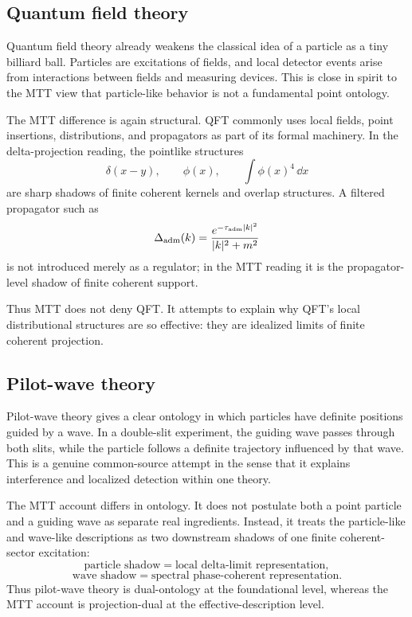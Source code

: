 \documentclass[11pt]{article}
\newcommand{\ta}{\tau_{\mathrm{adm}}}
\begin{document}
\subsection{Quantum field theory}
\label{subsec:relation-qft}

Quantum field theory already weakens the classical idea of a particle as a tiny billiard ball.
Particles are excitations of fields, and local detector events arise from interactions between
fields and measuring devices. This is close in spirit to the MTT view that particle-like
behavior is not a fundamental point ontology.

The MTT difference is again structural. QFT commonly uses local fields, point insertions,
distributions, and propagators as part of its formal machinery. In the delta-projection
reading, the pointlike structures
\begin{equation}
  \delta(x-y),
  \qquad
  \phi(x),
  \qquad
  \int \phi(x)^4\,\dd x
\end{equation}
are sharp shadows of finite coherent kernels and overlap structures. A filtered propagator
such as
\begin{equation}
  \Delta_{\rm adm}(k)
  =
  \frac{e^{-\ta |k|^2}}{|k|^2+m^2}
\end{equation}
is not introduced merely as a regulator; in the MTT reading it is the propagator-level shadow
of finite coherent support.

Thus MTT does not deny QFT. It attempts to explain why QFT's local distributional structures
are so effective: they are idealized limits of finite coherent projection.

\subsection{Pilot-wave theory}
\label{subsec:relation-pilot-wave}

Pilot-wave theory gives a clear ontology in which particles have definite positions guided by
a wave. In a double-slit experiment, the guiding wave passes through both slits, while the
particle follows a definite trajectory influenced by that wave. This is a genuine common-source
attempt in the sense that it explains interference and localized detection within one theory.

The MTT account differs in ontology. It does not postulate both a point particle and a guiding
wave as separate real ingredients. Instead, it treats the particle-like and wave-like descriptions
as two downstream shadows of one finite coherent-sector excitation:
\begin{equation}
  \text{particle shadow}
  =
  \text{local delta-limit representation},
\end{equation}
\begin{equation}
  \text{wave shadow}
  =
  \text{spectral phase-coherent representation}.
\end{equation}
Thus pilot-wave theory is dual-ontology at the foundational level, whereas the MTT account
is projection-dual at the effective-description level.
\end{document}
